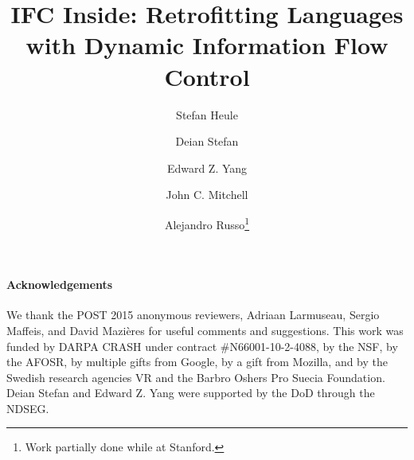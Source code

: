 \documentclass{llncs}
\newif\ifextended
\begin{document}


\title{
IFC Inside: Retrofitting Languages with Dynamic Information Flow Control
}
\ifextended
\subtitle{Extended Version}
\fi

\author{
 Stefan Heule \and
 Deian Stefan \and
 Edward Z. Yang \and
 John C. Mitchell \and
 Alejandro Russo\protect\footnote{Work partially done while at Stanford.}
}

\maketitle


{\small
\paragraph{Acknowledgements}
We thank the POST 2015 anonymous reviewers,
Adriaan Larmuseau,
Sergio Maffeis, and
David Mazi\`eres
for useful comments and suggestions.
%
This work was funded by DARPA CRASH under contract \#N66001-10-2-4088,
by the NSF, by the AFOSR,
by multiple gifts from Google, by a gift from Mozilla,
and by the Swedish research agencies VR and the Barbro Oshers Pro
Suecia Foundation.
%
Deian Stefan and Edward Z. Yang were supported by the DoD through the
NDSEG.
}


{\frenchspacing\scriptsize
  \setlength{\bibsep}{2pt}
  
  
}

\ifextended
\clearpage
\balance
\fi
\end{document}

